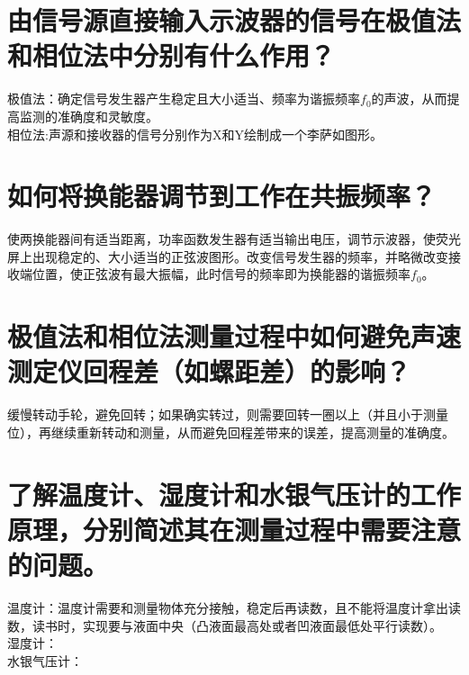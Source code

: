 \documentclass{article}
\begin{document}
\section{由信号源直接输入示波器的信号在极值法和相位法中分别有什么作用？}
极值法：确定信号发生器产生稳定且大小适当、频率为谐振频率$f_0$的声波，从而提高监测的准确度和灵敏度。\\
相位法:声源和接收器的信号分别作为X和Y绘制成一个李萨如图形。
\section{如何将换能器调节到工作在共振频率？}
使两换能器间有适当距离，功率函数发生器有适当输出电压，调节示波器，使荧光屏上出现稳定的、大小适当的正弦波图形。改变信号发生器的频率，并略微改变接收端位置，使正弦波有最大振幅，此时信号的频率即为换能器的谐振频率$f_0$。
\section{极值法和相位法测量过程中如何避免声速测定仪回程差（如螺距差）的影响？}
缓慢转动手轮，避免回转；如果确实转过，则需要回转一圈以上（并且小于测量位），再继续重新转动和测量，从而避免回程差带来的误差，提高测量的准确度。
\section{了解温度计、湿度计和水银气压计的工作原理，分别简述其在测量过程中需要注意的问题。}
温度计：温度计需要和测量物体充分接触，稳定后再读数，且不能将温度计拿出读数，读书时，实现要与液面中央（凸液面最高处或者凹液面最低处平行读数）。\\
湿度计：\\
水银气压计：
\end{document}
